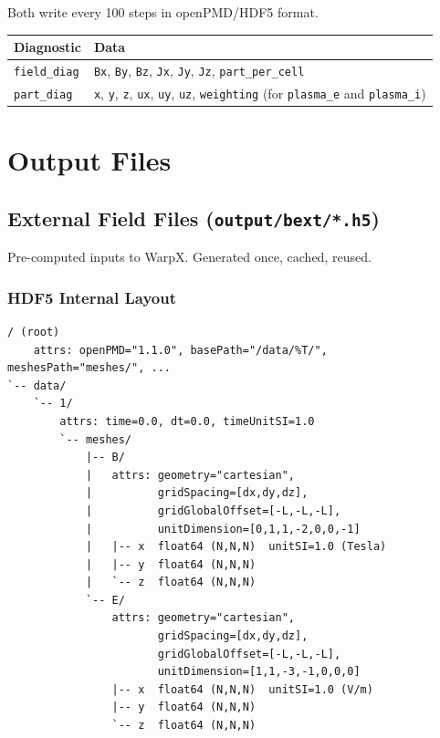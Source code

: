 \documentclass[11pt, a4paper]{article}
\begin{document}
Both write every 100 steps in openPMD/HDF5 format.

\begin{longtable}{L{3cm} L{10cm}}
\toprule
\textbf{Diagnostic} & \textbf{Data} \\
\midrule
\texttt{field\_diag} & \texttt{Bx}, \texttt{By}, \texttt{Bz}, \texttt{Jx}, \texttt{Jy}, \texttt{Jz}, \texttt{part\_per\_cell} \\
\texttt{part\_diag}  & \texttt{x}, \texttt{y}, \texttt{z}, \texttt{ux}, \texttt{uy}, \texttt{uz}, \texttt{weighting} (for \texttt{plasma\_e} and \texttt{plasma\_i}) \\
\bottomrule
\end{longtable}

\section{Output Files}

\subsection{External Field Files (\texttt{output/bext/*.h5})}

Pre-computed inputs to WarpX. Generated once, cached, reused.

\subsubsection*{HDF5 Internal Layout}
\begin{lstlisting}[style=plain]
/ (root)
    attrs: openPMD="1.1.0", basePath="/data/%T/", meshesPath="meshes/", ...
`-- data/
    `-- 1/
        attrs: time=0.0, dt=0.0, timeUnitSI=1.0
        `-- meshes/
            |-- B/
            |   attrs: geometry="cartesian",
            |          gridSpacing=[dx,dy,dz],
            |          gridGlobalOffset=[-L,-L,-L],
            |          unitDimension=[0,1,1,-2,0,0,-1]
            |   |-- x  float64 (N,N,N)  unitSI=1.0 (Tesla)
            |   |-- y  float64 (N,N,N)
            |   `-- z  float64 (N,N,N)
            `-- E/
                attrs: geometry="cartesian",
                       gridSpacing=[dx,dy,dz],
                       gridGlobalOffset=[-L,-L,-L],
                       unitDimension=[1,1,-3,-1,0,0,0]
                |-- x  float64 (N,N,N)  unitSI=1.0 (V/m)
                |-- y  float64 (N,N,N)
                `-- z  float64 (N,N,N)
\end{lstlisting}
\end{document}
